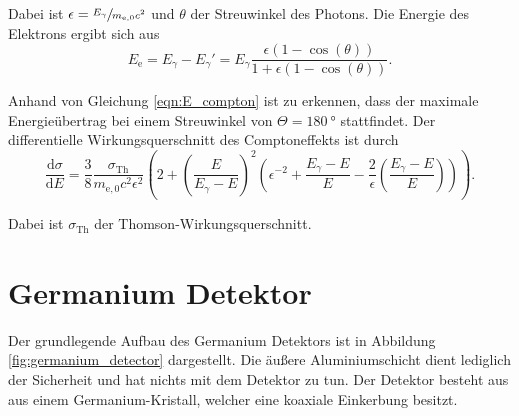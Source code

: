Dabei ist $\epsilon = \sfrac{E_{\gamma}}{m_{\mathrm{e,0}}c^2}$ und $\theta$ der Streuwinkel des Photons. Die Energie des Elektrons ergibt sich aus 
\begin{equation}
    \label{eqn:E_elek_compton}
    E_\mathrm{e} = E_{\gamma} - E_{\gamma}' = E_{\gamma}\frac{\epsilon(1-\cos(\theta))}{1+\epsilon(1-\cos(\theta))}.
\end{equation}

Anhand von Gleichung \ref{eqn:E_compton} ist zu erkennen, dass der maximale Energieübertrag bei einem Streuwinkel von $\Theta = \qty{180}{\degree}$ stattfindet.
Der differentielle Wirkungsquerschnitt des Comptoneffekts ist durch 
\begin{equation}
    \label{eqn:WQ_compton}
    \frac{\mathrm{d}\sigma}{\mathrm{d}E} = \frac{3}{8}\frac{\sigma_\mathrm{Th}}{m_{\mathrm{e,0}}c^2\epsilon^2}\left(2+\left(\frac{E}{E_{\gamma} - E}\right)^2\left(\epsilon^{-2}+\frac{E_{\gamma} - E}{E}-\frac{2}{\epsilon}\left(\frac{E_{\gamma} - E}{E}\right)\right)\right).
\end{equation}

Dabei ist $\sigma_\mathrm{Th}$ der Thomson-Wirkungsquerschnitt.

\section{Germanium Detektor}
\label{sec:germanium_detektor}
Der grundlegende Aufbau des Germanium Detektors ist in Abbildung \ref{fig:germanium_detector} dargestellt. Die äußere Aluminiumschicht dient lediglich der Sicherheit und hat nichts 
mit dem Detektor zu tun. Der Detektor besteht aus aus einem Germanium-Kristall, welcher eine koaxiale Einkerbung besitzt. 

